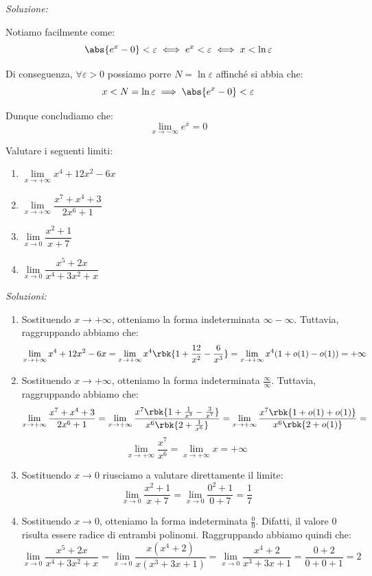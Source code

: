 \documentclass[a4paper, 12pt]{report}
\begin{document}
    \textit{Soluzione:}

    Notiamo facilmente come:
    \[\abs{e^x - 0} < \varepsilon \iff e^x < \varepsilon \iff x < \ln \varepsilon\]

    Di conseguenza, $\forall \varepsilon > 0$ possiamo porre $N = \ln \varepsilon$ affinché si abbia che:
    \[x < N = \ln \varepsilon \implies \abs{e^x - 0} < \varepsilon\]

    Dunque concludiamo che:
    \[\lim_{x \to -\infty} e^x = 0\]

    \begin{framedprob}{}
        Valutare i seguenti limiti:
        \begin{enumerate}
            \item $\lim\limits_{x \to +\infty} x^4+12x^2-6x$
            \item $\lim\limits_{x \to +\infty} \dfrac{x^7+x^4+3}{2x^6+1}$
            \item $\lim\limits_{x \to 0} \dfrac{x^2+1}{x+7}$
            \item $\lim\limits_{x \to 0} \dfrac{x^5+2x}{x^4+3x^2+x}$
        \end{enumerate}
    \end{framedprob}

    \textit{Soluzioni:}

    \begin{enumerate}
        \item Sostituendo $x \to +\infty$, otteniamo la forma indeterminata $\infty- \infty$. Tuttavia, raggruppando abbiamo che:
        \[\lim\limits_{x \to +\infty} x^4+12x^2-6x = \lim\limits_{x \to +\infty} x^4\rbk{1+\frac{12}{x^2}-\frac{6}{x^3}} = \lim\limits_{x \to +\infty} x^4 (1 + o(1) - o(1)) = +\infty\]

        \item Sostituendo $x \to +\infty$, otteniamo la forma indeterminata $\frac{\infty}{\infty}$. Tuttavia, raggruppando abbiamo che:
        \[\lim_{x \to +\infty} \frac{x^7+x^4+3}{2x^6+1} = \lim_{x \to +\infty} \frac{x^7 \rbk{1+\frac{1}{x^3}-\frac{3}{x^7}}}{x^6 \rbk{2+\frac{1}{x^6}}} = \lim_{x \to +\infty} \frac{x^7 \rbk{1+o(1) + o(1)}}{x^6 \rbk{2+o(1)}} = \]
        \[\lim_{x \to +\infty} \frac{x^7}{x^6} = \lim_{x \to +\infty} x= +\infty\]

        \item Sostituendo $x \to 0$ riusciamo a valutare direttamente il limite:
        \[\lim\limits_{x \to 0} \dfrac{x^2+1}{x+7} = \lim\limits_{x \to 0} \frac{0^2+1}{0+7} = \frac{1}{7}\]

        \item Sostituendo $x \to 0$, otteniamo la forma indeterminata $\frac{0}{0}$. Difatti, il valore 0 risulta essere radice di entrambi polinomi. Raggruppando abbiamo quindi che:
        \[\lim\limits_{x \to 0} \dfrac{x^5+2x}{x^4+3x^2+x} = \lim\limits_{x \to 0} \dfrac{x(x^4+2)}{x(x^3+3x+1)} = \lim\limits_{x \to 0} \dfrac{x^4+2}{x^3+3x+1} = \frac{0+2}{0+0+1} = 2\]
    \end{enumerate}
\end{document}
